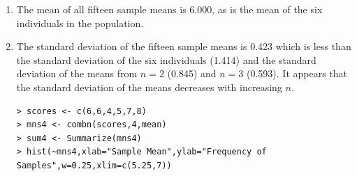 \documentclass[10pt,openany]{book}\usepackage[]{graphicx}\usepackage[]{color}
\makeatletter
\newenvironment{kframe}{%
 \def\at@end@of@kframe{}%
 \ifinner\ifhmode%
  \def\at@end@of@kframe{\end{minipage}}%
  \begin{minipage}{\columnwidth}%
 \fi\fi%
 \def\FrameCommand##1{\hskip\@totalleftmargin \hskip-\fboxsep
 \colorbox{shadecolor}{##1}\hskip-\fboxsep
     \hskip-\linewidth \hskip-\@totalleftmargin \hskip\columnwidth}%
 \MakeFramed {\advance\hsize-\width
   \@totalleftmargin\z@ \linewidth\hsize
   \@setminipage}}%
 {\par\unskip\endMakeFramed%
 \at@end@of@kframe}
\newenvironment{knitrout}{}{} %
\makeatother
\begin{document}
\begin{itemize}
\begin{enumerate}
\begin{knitrout}
\end{knitrout}
      \item The mean of all fifteen sample means is 6.000, as is the mean of the six individuals in the population.
      \item The standard deviation of the fifteen sample means is 0.423 which is less than the standard deviation of the six individuals (1.414) and the standard deviation of the means from $n=2$ (0.845) and $n=3$ (0.593).  It appears that the standard deviation of the means decreases with increasing $n$.
\begin{knitrout}
\color{fgcolor}\begin{kframe}
\begin{verbatim}
> scores <- c(6,6,4,5,7,8)
> mns4 <- combn(scores,4,mean)
> sum4 <- Summarize(mns4)
> hist(~mns4,xlab="Sample Mean",ylab="Frequency of Samples",w=0.25,xlim=c(5.25,7))
\end{verbatim}
\end{kframe}
\end{knitrout}
    \end{enumerate}


\end{itemize}
\end{document}
